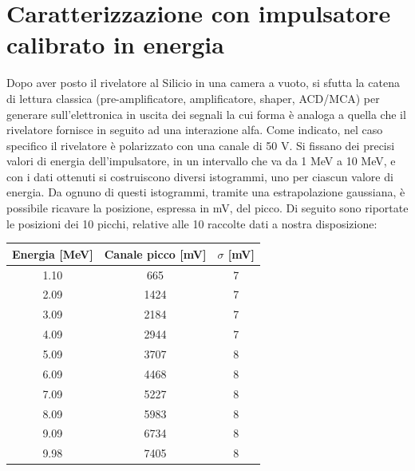 \documentclass[a4paper,10pt]{article}
\begin{document}
\section{Caratterizzazione con impulsatore calibrato in energia}
Dopo aver posto il rivelatore al Silicio in una camera a vuoto, si sfutta la catena di lettura classica (pre-amplificatore, amplificatore, shaper, ACD/MCA) per generare sull'elettronica in uscita dei segnali la cui forma \`e analoga a quella che il rivelatore fornisce in seguito ad una interazione alfa. Come indicato, nel caso specifico il rivelatore \`e polarizzato con una canale di 50 V. Si fissano dei precisi valori di energia dell'impulsatore, in un intervallo che va da 1 MeV a 10 MeV, e con i dati ottenuti si costruiscono diversi istogrammi, uno per ciascun valore di energia. Da ognuno di questi istogrammi, tramite una estrapolazione gaussiana, \`e possibile ricavare la posizione, espressa in mV, del picco. Di seguito sono riportate le posizioni dei 10 picchi, relative alle 10 raccolte dati a nostra disposizione:
\begin{center}
    \begin{tabular}{ccc}
        \toprule
        Energia [MeV] & Canale picco [mV] & $\sigma$ [mV]\\
        \midrule
        1.10 & 665 & 7\\
        2.09 & 1424 & 7\\
        3.09 & 2184 & 7\\
        4.09 & 2944 & 7\\
        5.09 & 3707 & 8\\
        6.09 & 4468 & 8\\
        7.09 & 5227 & 8\\
        8.09 & 5983 & 8\\
        9.09 & 6734 & 8\\
        9.98 & 7405 & 8\\
        \bottomrule
    \end{tabular}\\
\end{center}
\end{document}
